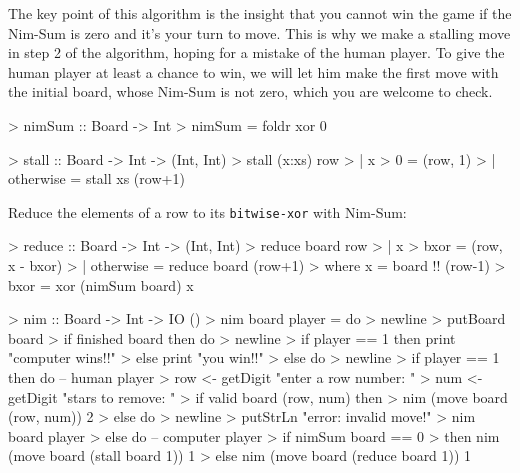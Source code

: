The key point of this algorithm is the insight that you cannot win the game if the Nim-Sum is zero and it's your turn to move.
This is why we make a stalling move in step 2 of the algorithm, hoping for a mistake of the human player.
To give the human player at least a chance to win, we will let him make the first move with the initial board, whose Nim-Sum is not zero, which you are welcome to check.

\begin{impl}
\end{impl}
\begin{haskellcode}

> nimSum :: Board -> Int
> nimSum = foldr xor 0

\end{haskellcode}

\begin{impl}
\end{impl}
\begin{haskellcode}

> stall :: Board -> Int -> (Int, Int)
> stall (x:xs) row
>     | x > 0 = (row, 1)
>     | otherwise = stall xs (row+1)

\end{haskellcode}

\begin{impl}[Steps 3 - 5]
Reduce the elements of a row to its \texttt{bitwise-xor} with Nim-Sum:
\end{impl}
\begin{haskellcode}

> reduce :: Board -> Int -> (Int, Int)
> reduce board row
>     | x > bxor = (row, x - bxor)
>     | otherwise = reduce board (row+1)
>     where x = board !! (row-1)
>           bxor = xor (nimSum board) x

\end{haskellcode}

\begin{impl}
\end{impl}
\begin{haskellcode}

> nim :: Board -> Int -> IO ()
> nim board player = do
>     newline
>     putBoard board
>     if finished board then do 
>         newline
>         if player == 1 then print "computer wins!!"
>         else print "you win!!"
>     else do
>         newline
>         if player == 1 then do -- human player
>             row <- getDigit "enter a row number: "
>             num <- getDigit "stars to remove: "
>             if valid board (row, num) then
>                 nim (move board (row, num)) 2
>             else do
>                 newline
>                 putStrLn "error: invalid move!"
>                 nim board player
>         else do -- computer player
>             if nimSum board == 0
>                 then nim (move board (stall board 1)) 1
>                 else nim (move board (reduce board 1)) 1

\end{haskellcode}


